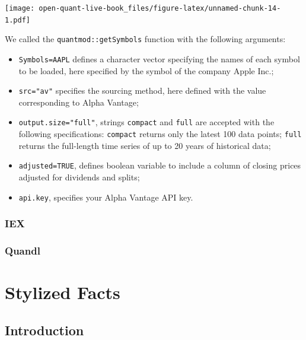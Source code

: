\documentclass[]{book}
\newenvironment{Shaded}{\begin{snugshade}}{\end{snugshade}}
\newcommand{\KeywordTok}[1]{\textcolor[rgb]{0.13,0.29,0.53}{\textbf{#1}}}
\newcommand{\OperatorTok}[1]{\textcolor[rgb]{0.81,0.36,0.00}{\textbf{#1}}}
\newcommand{\NormalTok}[1]{#1}
\providecommand{\tightlist}{%
  \setlength{\itemsep}{0pt}\setlength{\parskip}{0pt}}
\begin{document}
\begin{Shaded}
\end{Shaded}

\texttt{[image: open-quant-live-book\_files/figure-latex/unnamed-chunk-14-1.pdf]}

We called the \texttt{quantmod::getSymbols} function with the following
arguments:

\begin{itemize}
\tightlist
\item
  \texttt{Symbols=\textquotesingle{}AAPL\textquotesingle{}} defines a
  character vector specifying the names of each symbol to be loaded,
  here specified by the symbol of the company Apple Inc.;
\item
  \texttt{src="av"} specifies the sourcing method, here defined with the
  value corresponding to Alpha Vantage;
\item
  \texttt{output.size="full"}, strings \texttt{compact} and
  \texttt{full} are accepted with the following specifications:
  \texttt{compact} returns only the latest 100 data points;
  \texttt{full} returns the full-length time series of up to 20 years of
  historical data;
\item
  \texttt{adjusted=TRUE}, defines boolean variable to include a column
  of closing prices adjusted for dividends and splits;
\item
  \texttt{api.key}, specifies your Alpha Vantage API key.
\end{itemize}

\subsection{IEX}\label{iex}

\subsection{Quandl}\label{quandl}

\chapter{Stylized Facts}\label{stylized-facts}

\section{Introduction}\label{introduction}
\end{document}
